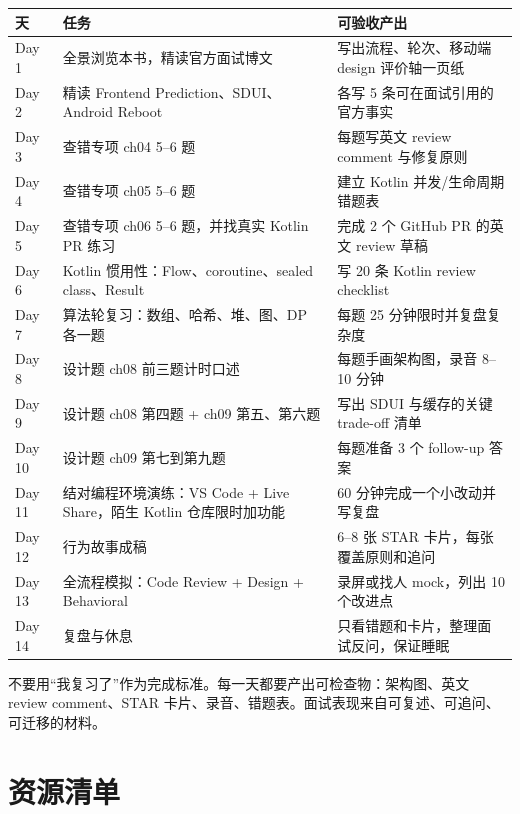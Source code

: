 \begin{center}
\begin{tabularx}{\linewidth}{@{}l X X@{}}
\toprule
\textbf{天} & \textbf{任务} & \textbf{可验收产出} \\
\midrule
Day 1 & 全景浏览本书，精读官方面试博文 & 写出流程、轮次、移动端 design 评价轴一页纸 \\
Day 2 & 精读 Frontend Prediction、SDUI、Android Reboot & 各写 5 条可在面试引用的官方事实 \\
Day 3 & 查错专项 ch04 5--6 题 & 每题写英文 review comment 与修复原则 \\
Day 4 & 查错专项 ch05 5--6 题 & 建立 Kotlin 并发/生命周期错题表 \\
Day 5 & 查错专项 ch06 5--6 题，并找真实 Kotlin PR 练习 & 完成 2 个 GitHub PR 的英文 review 草稿 \\
Day 6 & Kotlin 惯用性：Flow、coroutine、sealed class、Result & 写 20 条 Kotlin review checklist \\
Day 7 & 算法轮复习：数组、哈希、堆、图、DP 各一题 & 每题 25 分钟限时并复盘复杂度 \\
Day 8 & 设计题 ch08 前三题计时口述 & 每题手画架构图，录音 8--10 分钟 \\
Day 9 & 设计题 ch08 第四题 + ch09 第五、第六题 & 写出 SDUI 与缓存的关键 trade-off 清单 \\
Day 10 & 设计题 ch09 第七到第九题 & 每题准备 3 个 follow-up 答案 \\
Day 11 & 结对编程环境演练：VS Code + Live Share，陌生 Kotlin 仓库限时加功能 & 60 分钟完成一个小改动并写复盘 \\
Day 12 & 行为故事成稿 & 6--8 张 STAR 卡片，每张覆盖原则和追问 \\
Day 13 & 全流程模拟：Code Review + Design + Behavioral & 录屏或找人 mock，列出 10 个改进点 \\
Day 14 & 复盘与休息 & 只看错题和卡片，整理面试反问，保证睡眠 \\
\bottomrule
\end{tabularx}
\end{center}

\begin{idea}[冲刺期的验收标准]
不要用“我复习了”作为完成标准。每一天都要产出可检查物：架构图、英文 review comment、STAR 卡片、录音、错题表。面试表现来自可复述、可追问、可迁移的材料。
\end{idea}

\clearpage
\section{资源清单}

